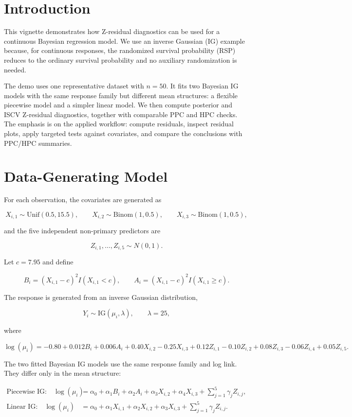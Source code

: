 \documentclass[
  english,
  letterpaper,
  DIV=11,
  numbers=noendperiod]{scrartcl}
\begin{document}
\section{Introduction}\label{introduction}

This vignette demonstrates how Z-residual diagnostics can be used for a
continuous Bayesian regression model. We use an inverse Gaussian (IG)
example because, for continuous responses, the randomized survival
probability (RSP) reduces to the ordinary survival probability and no
auxiliary randomization is needed.

The demo uses one representative dataset with \(n=50\). It fits two
Bayesian IG models with the same response family but different mean
structures: a flexible piecewise model and a simpler linear model. We
then compute posterior and ISCV Z-residual diagnostics, together with
comparable PPC and HPC checks. The emphasis is on the applied workflow:
compute residuals, inspect residual plots, apply targeted tests against
covariates, and compare the conclusions with PPC/HPC summaries.

\section{Data-Generating Model}\label{data-generating-model}

For each observation, the covariates are generated as

\[
X_{i,1}\sim \mathrm{Unif}(0.5,15.5),\qquad
X_{i,2}\sim \mathrm{Binom}(1,0.5),\qquad
X_{i,3}\sim \mathrm{Binom}(1,0.5),
\]

and the five independent non-primary predictors are

\[
Z_{i,1},\ldots,Z_{i,5}\sim N(0,1).
\]

Let \(c=7.95\) and define

\[
B_i=(X_{i,1}-c)^2 I(X_{i,1}<c),\qquad
A_i=(X_{i,1}-c)^2 I(X_{i,1}\ge c).
\]

The response is generated from an inverse Gaussian distribution,

\[
Y_i\sim \mathrm{IG}(\mu_i,\lambda),\qquad \lambda=25,
\]

where

\[
\log(\mu_i)=
-0.80+0.012B_i+0.006A_i+0.40X_{i,2}-0.25X_{i,3}
+0.12Z_{i,1}-0.10Z_{i,2}+0.08Z_{i,3}-0.06Z_{i,4}+0.05Z_{i,5}.
\]

The two fitted Bayesian IG models use the same response family and log
link. They differ only in the mean structure:

\[
\begin{aligned}
\text{Piecewise IG:}\quad
\log(\mu_i)&=\alpha_0+\alpha_1B_i+\alpha_2A_i+\alpha_3X_{i,2}+\alpha_4X_{i,3}+\sum_{j=1}^5\gamma_j Z_{i,j},\\
\text{Linear IG:}\quad
\log(\mu_i)&=\alpha_0+\alpha_1X_{i,1}+\alpha_2X_{i,2}+\alpha_3X_{i,3}+\sum_{j=1}^5\gamma_j Z_{i,j}.
\end{aligned}
\]
\end{document}
